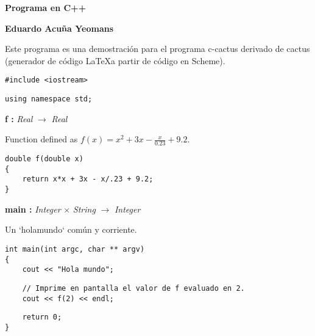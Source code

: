 \documentclass[letterpaper, 12pt]{article}
\begin{document}
\hfill {\LARGE \textbf{Programa en C++} }

\bigskip


\hfill {\large \textbf{Eduardo Acuña Yeomans} }

\bigskip


\bigskip

Este programa es una demostración para el programa c-cactus
derivado de cactus (generador de código \LaTeX  a partir de código en
Scheme).

\bigskip


\begin{verbatim}
#include <iostream>
\end{verbatim}


\begin{verbatim}
using namespace std;
\end{verbatim}


\bigskip

\bigskip

\textbf{f :} \emph{Real} $\boldsymbol{\rightarrow}$ \emph{Real}


Function defined as $f(x)=x^2+3x-\frac{x}{0.23}+9.2$.
\begin{verbatim}
double f(double x)
{
    return x*x + 3x - x/.23 + 9.2;
}
\end{verbatim}


\bigskip

\bigskip

\textbf{main :} \emph{Integer} $\times$ \emph{String} $\boldsymbol{\rightarrow}$ \emph{Integer}


Un `holamundo` común y corriente.
\begin{verbatim}
int main(int argc, char ** argv)
{
    cout << "Hola mundo";
\end{verbatim}


\begin{verbatim}
    // Imprime en pantalla el valor de f evaluado en 2.
    cout << f(2) << endl;
\end{verbatim}


\begin{verbatim}
    return 0;
}
\end{verbatim}
\end{document}
